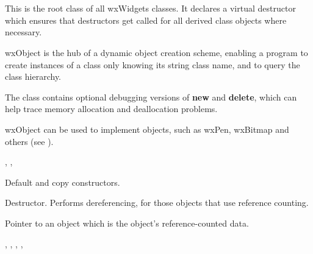 \section{}\label{wxobject}

This is the root class of all wxWidgets classes.
It declares a virtual destructor which ensures that
destructors get called for all derived class objects where necessary.

wxObject is the hub of a dynamic object creation
scheme, enabling a program to create instances of a class only knowing
its string class name, and to query the class hierarchy.

The class contains optional debugging versions
of {\bf new} and {\bf delete}, which can help trace memory allocation
and deallocation problems.

wxObject can be used to implement  objects,
such as wxPen, wxBitmap and others (see ).


, ,\rtfsp
{}


\label{wxobjectctor}



Default and copy constructors.

\label{wxobjectdtor}


Destructor. Performs dereferencing, for those objects
that use reference counting.

\label{wxobjectmrefdata}


Pointer to an object which is the object's reference-counted data.


, ,\rtfsp
{},\rtfsp
{},\rtfsp
{}


